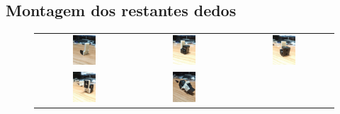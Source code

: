 \subsection{Montagem dos restantes dedos}

\begin{figure}[H]
\centering
\begin{tabular}{ccc}
  \includegraphics[width=0.25\textwidth]{figs/appendix/dedo/1.jpg} &
  \includegraphics[width=0.25\textwidth]{figs/appendix/dedo/2.jpg} &
  \includegraphics[width=0.25\textwidth]{figs/appendix/dedo/3.jpg} \\
  \includegraphics[width=0.25\textwidth]{figs/appendix/dedo/4.jpg} &
  \includegraphics[width=0.25\textwidth]{figs/appendix/dedo/5.jpg} &

\end{tabular}
\end{figure}
